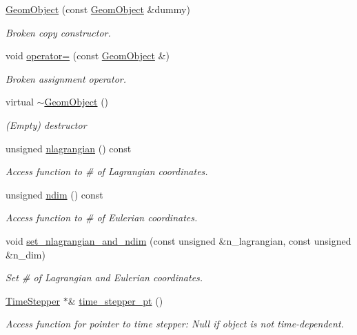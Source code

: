 \begin{DoxyCompactItemize}
\hyperlink{classoomph_1_1GeomObject_a4692862c406fe6dfa04c21b4a4f09892}{Geom\+Object} (const \hyperlink{classoomph_1_1GeomObject}{Geom\+Object} \&dummy)
\begin{DoxyCompactList}\small\item\em Broken copy constructor. \end{DoxyCompactList}\item 
void \hyperlink{classoomph_1_1GeomObject_a1b9d4809025ee6d0487710073b194fd3}{operator=} (const \hyperlink{classoomph_1_1GeomObject}{Geom\+Object} \&)
\begin{DoxyCompactList}\small\item\em Broken assignment operator. \end{DoxyCompactList}\item 
virtual \hyperlink{classoomph_1_1GeomObject_ab784d34d63bd852ee30fc03684717410}{$\sim$\+Geom\+Object} ()
\begin{DoxyCompactList}\small\item\em (Empty) destructor \end{DoxyCompactList}\item 
unsigned \hyperlink{classoomph_1_1GeomObject_ae8974ee138b0f879c459340a9f05e06c}{nlagrangian} () const
\begin{DoxyCompactList}\small\item\em Access function to \# of Lagrangian coordinates. \end{DoxyCompactList}\item 
unsigned \hyperlink{classoomph_1_1GeomObject_a0305c3102fa6f5042461afb600a082df}{ndim} () const
\begin{DoxyCompactList}\small\item\em Access function to \# of Eulerian coordinates. \end{DoxyCompactList}\item 
void \hyperlink{classoomph_1_1GeomObject_a375ecd197d0aff695825ad33a35e0d7e}{set\+\_\+nlagrangian\+\_\+and\+\_\+ndim} (const unsigned \&n\+\_\+lagrangian, const unsigned \&n\+\_\+dim)
\begin{DoxyCompactList}\small\item\em Set \# of Lagrangian and Eulerian coordinates. \end{DoxyCompactList}\item 
\hyperlink{classoomph_1_1TimeStepper}{Time\+Stepper} $\ast$\& \hyperlink{classoomph_1_1GeomObject_a3c92023891dd4a0e818022f467eeb7f1}{time\+\_\+stepper\+\_\+pt} ()
\begin{DoxyCompactList}\small\item\em Access function for pointer to time stepper\+: Null if object is not time-\/dependent. \end{DoxyCompactList}\item 

\end{DoxyCompactItemize}
